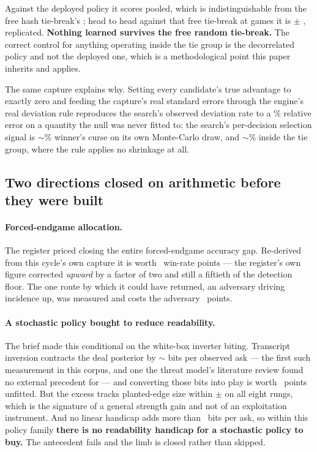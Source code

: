 Against the deployed policy it scores \vsevenKfiveTieOnly{} pooled, which is indistinguishable from the free hash tie-break's \vsevenKfiveFreeTie{}; head to head against that free tie-break at \vsevenPhaseTwoCell{} games it is
\vsevenKfiveHeadToHead{} $\pm$ \vsevenKfivePm{}, replicated. \textbf{Nothing learned survives the free
random tie-break.} The correct control for anything operating inside the tie group is the
decorrelated policy and not the deployed one, which is a methodological point this paper inherits
and applies.

The same capture explains why. Setting every candidate's true advantage to exactly zero and feeding
the capture's real standard errors through the engine's real deviation rule reproduces the search's observed deviation rate to a \vsevenCurseRelErr\% relative error on a quantity the null was never fitted to: the
search's per-decision selection signal is $\sim$\vsevenCurseShare\% winner's curse on its own
Monte-Carlo draw, and $\sim$\vsevenCurseTieShare\% inside the tie group, where the rule applies no
shrinkage at all.

\subsection{Two directions closed on arithmetic before they were built}
\label{sec:rejected-arithmetic}

\paragraph{Forced-endgame allocation.} The register priced closing the entire forced-endgame accuracy
gap. Re-derived from this cycle's own capture it is worth \vsevenLthirteenClose{}~win-rate points ---
the register's own figure corrected \emph{upward} by a factor of two and still a fiftieth of the
detection floor. The one route by which it could have returned, an adversary driving incidence up, was measured and costs the adversary \vsevenLthirteenAdvCost{}~points.

\paragraph{A stochastic policy bought to reduce readability.} The brief made this conditional on the
white-box inverter biting. Transcript inversion contracts the deal posterior by $\sim$\vsevenBitsPerAsk{} bits per observed
ask --- the first such measurement in this corpus, and one the threat model's literature review
found no external precedent for --- and
converting those bits into play is worth \vsevenInversionUnfitted{}~points unfitted. But the excess
tracks planted-edge size within $\pm$\vsevenInversionTrack{} on all eight rungs, which is the
signature of a general strength gain and not of an exploitation instrument. And no linear handicap
adds more than \vsevenHandicapBits{}~bits per ask, so within this policy family \textbf{there is no
readability handicap for a stochastic policy to buy.} The antecedent fails and the limb is closed
rather than skipped.

